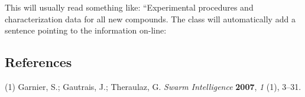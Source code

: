 \documentclass[journal=jacsat,manuscript=article]{achemso}
\begin{document}
\begin{suppinfo}

This will usually read something like: ``Experimental procedures and
characterization data for all new compounds. The class will
automatically add a sentence pointing to the information on-line:

\end{suppinfo}

\subsection*{References}\label{references-1}

\hypertarget{refs}{}
\hypertarget{ref-Garnier2007}{}
(1) Garnier, S.; Gautrais, J.; Theraulaz, G. \emph{Swarm Intelligence}
\textbf{2007}, \emph{1} (1), 3--31.
\end{document}
